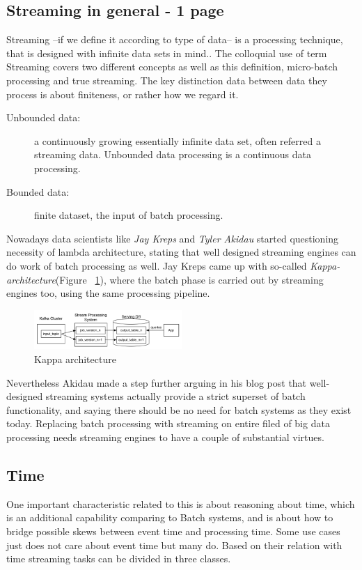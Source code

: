 \subsection{Streaming in general - 1 page}
Streaming --if we define it according to type of data-- is a processing technique, that is designed with infinite data sets in mind.\cite{101}. The colloquial use of term Streaming covers two different concepts as well as this definition, micro-batch processing and true streaming.
The key distinction data between data they process is about finiteness, or rather how we regard it.
\begin{description}
\item[Unbounded data:] a continuously growing essentially infinite data set, often referred a streaming data. Unbounded data processing is a continuous data processing.
\item[Bounded data:]finite dataset, the input of batch processing.
\end{description}
Nowadays data scientists like \textit{Jay Kreps} and \textit{Tyler Akidau} started questioning necessity of lambda architecture, stating that well designed streaming engines can do work of batch processing as well.  Jay Kreps came up with so-called \textit {Kappa- architecture}(Figure  ~\ref{fig:kappa}), where the batch phase is carried out by streaming engines too, using the same processing pipeline.
\begin{figure}[!ht]
  \centering    
      \includegraphics[width=0.5\textwidth]{figures/kappa-architecture.png}
  \caption{Kappa architecture \cite{beatCAP}}
  \label{fig:kappa}
\end{figure}
Nevertheless Akidau made a step further arguing in his blog post that well-designed streaming systems actually provide a strict superset of batch functionality, and saying there should be no need for batch systems as they exist today.
Replacing batch processing with streaming on entire filed of big data processing needs streaming engines to have a couple of substantial virtues. 

\subsection{Time }
One important characteristic related to this is about reasoning about time, which is an additional capability comparing to Batch systems, and is about how to bridge possible skews between event time and processing time. Some use cases just does not care about event time but many do. Based on their relation with time streaming tasks can be divided in three classes.

